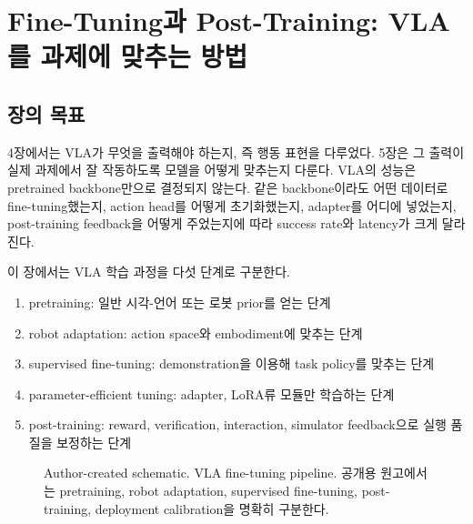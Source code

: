 \chapter{Fine-Tuning과 Post-Training: VLA를 과제에 맞추는 방법}

\section{장의 목표}

4장에서는 VLA가 무엇을 출력해야 하는지, 즉 행동 표현을 다루었다. 5장은 그 출력이 실제 과제에서 잘 작동하도록 모델을 어떻게 맞추는지 다룬다. VLA의 성능은 pretrained backbone만으로 결정되지 않는다. 같은 backbone이라도 어떤 데이터로 fine-tuning했는지, action head를 어떻게 초기화했는지, adapter를 어디에 넣었는지, post-training feedback을 어떻게 주었는지에 따라 success rate와 latency가 크게 달라진다.

이 장에서는 VLA 학습 과정을 다섯 단계로 구분한다.

\begin{enumerate}
  \item pretraining: 일반 시각-언어 또는 로봇 prior를 얻는 단계
  \item robot adaptation: action space와 embodiment에 맞추는 단계
  \item supervised fine-tuning: demonstration을 이용해 task policy를 맞추는 단계
  \item parameter-efficient tuning: adapter, LoRA류 모듈만 학습하는 단계
  \item post-training: reward, verification, interaction, simulator feedback으로 실행 품질을 보정하는 단계
\end{enumerate}

\begin{figure}[t]
  \centering
  \caption{Author-created schematic. VLA fine-tuning pipeline. 공개용 원고에서는 pretraining, robot adaptation, supervised fine-tuning, post-training, deployment calibration을 명확히 구분한다.}
  \label{fig:finetuning_pipeline}
\end{figure}

